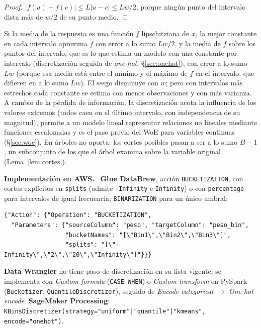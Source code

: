 \documentclass[11pt,a4paper]{article}
\theoremstyle{plain}
\theoremstyle{definition}
\theoremstyle{remark}
\newcommand{\1}{\mathbf{1}}
\newenvironment{aws}{\par\medskip\sloppy\noindent\textbf{Implementación en AWS.}\ }{\par\medskip}
\begin{document}
\begin{proof}
$|f(u)-f(c)|\le L|u-c|\le Lw/2$, porque ningún punto del intervalo dista
más de $w/2$ de su punto medio.
\end{proof}

Si la media de la respuesta es una función $f$ lipschitziana de $x$, la
mejor constante en cada intervalo aproxima $f$ con error a lo sumo $Lw/2$,
y la media de $f$ sobre los puntos del intervalo, que es lo que estima un
modelo con una constante por intervalo (discretización seguida de
\emph{one-hot}, \S\ref{sec:onehot}), con error a lo sumo $Lw$ (porque esa
media está entre el mínimo y el máximo de $f$ en el intervalo, que difieren
en a lo sumo $Lw$). El sesgo disminuye con $w$; pero con intervalos más
estrechos cada constante se estima con menos observaciones y con más
varianza. A cambio
de la pérdida de información, la discretización acota la influencia de los
valores extremos (todos caen en el último intervalo, con independencia de
su magnitud), permite a un modelo lineal representar relaciones no
lineales mediante funciones escalonadas y es el paso previo del WoE para
variables continuas (\S\ref{sec:woe}). En árboles no aporta: los cortes
posibles pasan a ser a lo sumo $B-1$, un subconjunto de los que el árbol
examina sobre la variable original (Lema~\ref{lem:cortes}).

\begin{aws}
\textbf{Glue DataBrew}, acción \texttt{BUCKETIZATION}, con cortes
explícitos en \texttt{splits} (admite \texttt{-Infinity} e
\texttt{Infinity}) o con \texttt{percentage} para intervalos de igual
frecuencia; \texttt{BINARIZATION} para un único umbral:
\begin{lstlisting}
{"Action": {"Operation": "BUCKETIZATION",
  "Parameters": {"sourceColumn": "peso", "targetColumn": "peso_bin",
                 "bucketNames": "[\"Bin1\",\"Bin2\",\"Bin3\"]",
                 "splits": "[\"-Infinity\",\"2\",\"20\",\"Infinity\"]"}}}
\end{lstlisting}
\textbf{Data Wrangler} no tiene paso de discretización en su lista vigente;
se implementa con \emph{Custom formula} (\texttt{CASE WHEN}) o
\emph{Custom transform} en PySpark (\texttt{Bucketizer},
\texttt{QuantileDiscretizer}), seguido de \emph{Encode categorical}
$\to$ \emph{One-hot encode}. \textbf{SageMaker Processing}:
\texttt{KBinsDiscretizer(strategy="uniform"|"quantile"|"kmeans",
encode="onehot")}.
\end{aws}

\end{document}
